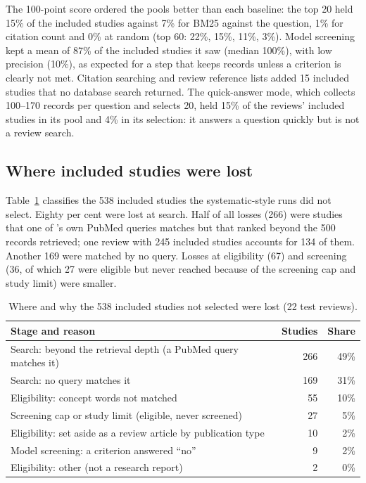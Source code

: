 The 100-point score ordered the pools better than each baseline: the top 20 held 15\% of the included studies
against 7\% for BM25 against the question, 1\% for citation count and 0\% at random (top 60: 22\%, 15\%, 11\%, 3\%).
Model screening kept a mean of 87\% of the included studies it saw (median 100\%), with low precision (10\%), as
expected for a step that keeps records unless a criterion is clearly not met. Citation searching and review
reference lists added 15 included studies that no database search returned. The quick-answer mode, which collects
100--170 records per question and selects 20, held 15\% of the reviews' included studies in its pool and 4\% in its
selection: it answers a question quickly but is not a review search.

\subsection{Where included studies were lost}
\label{sec:loss}

Table~\ref{tab:loss} classifies the 538 included studies the systematic-style runs did not select. Eighty per cent
were lost at search. Half of all losses (266) were studies that one of \tool{}'s own PubMed queries matches but that
ranked beyond the 500 records retrieved; one review with 245 included studies accounts for 134 of them. Another 169
were matched by no query. Losses at eligibility (67) and screening (36, of which 27 were eligible but never reached
because of the screening cap and study limit) were smaller.

\begin{table}[t]
\centering
\caption{Where and why the 538 included studies not selected were lost (22 test reviews).}
\label{tab:loss}
\footnotesize
\begin{tabularx}{\linewidth}{>{\raggedright\arraybackslash}Xrr}
\toprule
Stage and reason & Studies & Share \\
\midrule
Search: beyond the retrieval depth (a \tool{} PubMed query matches it) & 266 & 49\% \\
Search: no \tool{} query matches it & 169 & 31\% \\
Eligibility: concept words not matched & 55 & 10\% \\
Screening cap or study limit (eligible, never screened) & 27 & 5\% \\
Eligibility: set aside as a review article by publication type & 10 & 2\% \\
Model screening: a criterion answered ``no'' & 9 & 2\% \\
Eligibility: other (not a research report) & 2 & 0\% \\
\bottomrule
\end{tabularx}
\end{table}

